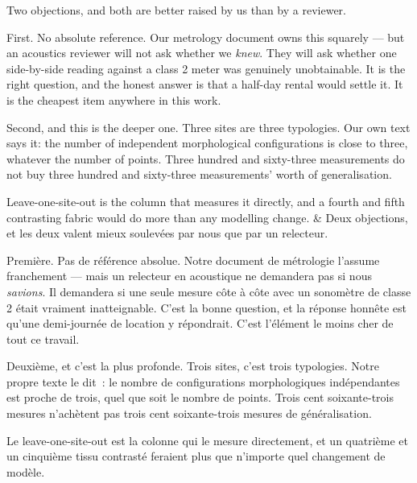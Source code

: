 \documentclass[10pt,a4paper]{article}
\begin{document}
\begin{say}
Two objections, and both are better raised by us than by a reviewer.

First. No absolute reference. Our metrology document owns this squarely --- but an
acoustics reviewer will not ask whether we \emph{knew}. They will ask whether one
side-by-side reading against a class 2 meter was genuinely unobtainable. It is the
right question, and the honest answer is that a half-day rental would settle it.
 It
is the cheapest item anywhere in this work.

Second, and this is the deeper one. Three sites are three typologies. Our own text
says it: the number of independent morphological configurations is close to three,
whatever the number of points. Three hundred and sixty-three measurements do not
buy three hundred and sixty-three measurements' worth of generalisation.

 Leave-one-site-out is the
column that measures it directly, and a fourth and fifth contrasting fabric would
do more than any modelling change.
&
Deux objections, et les deux valent mieux soulevées par nous que par un relecteur.

Première. Pas de référence absolue. Notre document de métrologie l'assume
franchement --- mais un relecteur en acoustique ne demandera pas si nous
\emph{savions}. Il demandera si une seule mesure côte à côte avec un sonomètre de
classe 2 était vraiment inatteignable. C'est la bonne question, et la réponse
honnête est qu'une demi-journée de location y répondrait.  C'est l'élément le moins cher de
tout ce travail.

Deuxième, et c'est la plus profonde. Trois sites, c'est trois typologies. Notre
propre texte le dit~: le nombre de configurations morphologiques indépendantes est
proche de trois, quel que soit le nombre de points. Trois cent soixante-trois
mesures n'achètent pas trois cent soixante-trois mesures de généralisation.

 Le
leave-one-site-out est la colonne qui le mesure directement, et un quatrième et un
cinquième tissu contrasté feraient plus que n'importe quel changement de modèle.
\end{say}
\end{document}

